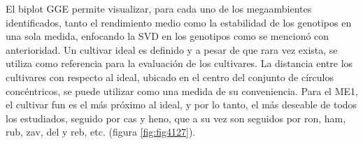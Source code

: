 
El biplot GGE permite visualizar, para cada uno de los megaambientes identificados, tanto el rendimiento medio como la estabilidad de los genotipos en una sola medida, enfocando la SVD en los genotipos como se mencionó con anterioridad. Un cultivar ideal es definido y a pesar de que rara vez exista, se utiliza como referencia para la evaluación de los cultivares. La distancia entre los cultivares con respecto al ideal, ubicado en el centro del conjunto de círculos concéntricos, se puede utilizar como una medida de su conveniencia. Para el ME1, el cultivar fun es el más próximo al ideal, y por lo tanto, el más deseable de todos los estudiados, seguido por cas y heno, que a su vez son seguidos por ron, ham, rub, zav, del y reb, etc. (figura \ref{fig:fig4127}).

